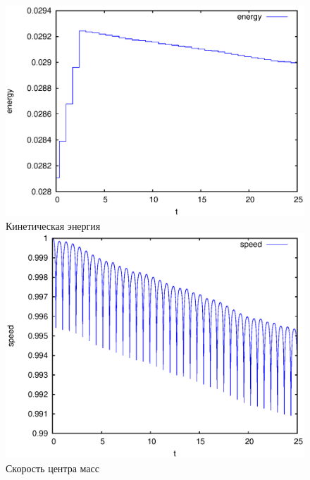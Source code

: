 \begin{figure}[H]
    \centering

    \begin{columns}
            \centering
            \includegraphics[width=\linewidth]{pic/rol__straight__kinetic_energy}\\
            Кинетическая энергия
            \centering
            \includegraphics[width=\linewidth]{pic/rol__straight__speed_of_center_of_mass}\\
            Скорость центра масс
    \end{columns}
    

\end{figure}
